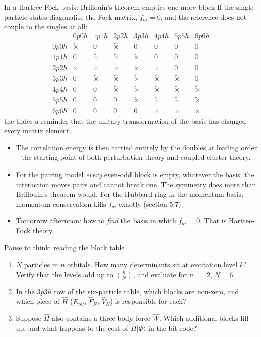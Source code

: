 \documentclass[aspectratio=169,10pt]{beamer}
\newcounter{thinkctr}
\newcommand{\thinkq}[2]{%
  \stepcounter{thinkctr}%
  \begin{tcolorbox}[colback=palewarm,colframe=warm,title={\bfseries Pause to think \#\thethinkctr\hfill\mdseries\small(about #1 min -- discuss with your neighbour)},fonttitle=\bfseries]
  #2
  \end{tcolorbox}}
\newcommand{\ket}[1]{\vert #1\rangle}
\begin{document}
\begin{frame}{In a Hartree-Fock basis: Brillouin's theorem empties one more block}
  \small
  If the single-particle states diagonalise the Fock matrix, $f_{ai}=0$, and the reference does not couple to the singles at all:
  \[
    \begin{array}{c|ccccccc}
       & 0p0h & 1p1h & 2p2h & 3p3h & 4p4h & 5p5h & 6p6h\\
      \hline
      0p0h & \tilde{\times} & 0 & \tilde{\times} & 0 & 0 & 0 & 0\\
      1p1h & 0 & \tilde{\times} & \tilde{\times} & \tilde{\times} & 0 & 0 & 0\\
      2p2h & \tilde{\times} & \tilde{\times} & \tilde{\times} & \tilde{\times} & \tilde{\times} & 0 & 0\\
      3p3h & 0 & \tilde{\times} & \tilde{\times} & \tilde{\times} & \tilde{\times} & \tilde{\times} & 0\\
      4p4h & 0 & 0 & \tilde{\times} & \tilde{\times} & \tilde{\times} & \tilde{\times} & \tilde{\times}\\
      5p5h & 0 & 0 & 0 & \tilde{\times} & \tilde{\times} & \tilde{\times} & \tilde{\times}\\
      6p6h & 0 & 0 & 0 & 0 & \tilde{\times} & \tilde{\times} & \tilde{\times}
    \end{array}
  \]
  the tildes a reminder that the unitary transformation of the basis has changed every matrix element.
  \begin{itemize}
    \item The correlation energy is then carried entirely by the doubles at leading order -- the starting point of both perturbation theory and coupled-cluster theory.
    \item For the pairing model \emph{every} even-odd block is empty, whatever the basis: the interaction moves pairs and cannot break one. The symmetry does more than Brillouin's theorem would. For the Hubbard ring in the momentum basis, momentum conservation kills $f_{ai}$ exactly (section 5.7).
    \item Tomorrow afternoon: how to \emph{find} the basis in which $f_{ai}=0$. That is Hartree-Fock theory.
  \end{itemize}
\end{frame}

\begin{frame}{Pause to think: reading the block table}
  \thinkq{3}{
  \begin{enumerate}
    \item $N$ particles in $n$ orbitals. How many determinants sit at excitation level $k$? Verify that the levels add up to $\binom{n}{N}$, and evaluate for $n=12$, $N=6$.
    \item In the $3p3h$ row of the six-particle table, which blocks are non-zero, and which piece of $\hat{H}$ ($E_{\mathrm{ref}}$, $\hat{F}_N$, $\hat{V}_N$) is responsible for each?
    \item Suppose $\hat{H}$ also contains a three-body force $\hat{W}$. Which additional blocks fill up, and what happens to the cost of $\hat{H}\ket{\Phi}$ in the bit code?
  \end{enumerate}}
\end{frame}
\end{document}
